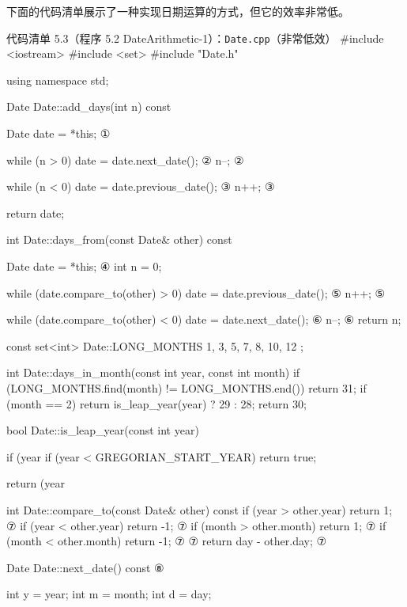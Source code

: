下面的代码清单展示了一种实现日期运算的方式，但它的效率非常低。

\begin{codeboxt}{代码清单 5.3（程序 5.2 DateArithmetic-1）：\texttt{Date.cpp}（非常低效）}
#include <iostream>
#include <set>
#include "Date.h"

using namespace std;

Date Date::add_days(int n) const
{
    Date date = *this;                            ①

    while (n > 0)
    {
        date = date.next_date();                  ②
        n--;                                      ②
    }

    while (n < 0)
    {
        date = date.previous_date();              ③
        n++;                                      ③
    }

    return date;
}

int Date::days_from(const Date& other) const
{
    Date date = *this;                            ④
    int n = 0;

    while (date.compare_to(other) > 0)
    {
        date = date.previous_date();              ⑤
        n++;                                      ⑤
    }

    while (date.compare_to(other) < 0)
    {
        date = date.next_date();                  ⑥ 
        n--;                                      ⑥
    }
    return n;
}

const set<int> Date::LONG_MONTHS { 1, 3, 5, 7, 8, 10, 12 };

int Date::days_in_month(const int year, const int month)
{
   if (LONG_MONTHS.find(month) != LONG_MONTHS.end()) return 31;
   if (month == 2) return is_leap_year(year) ? 29 : 28;
   return 30;
}

bool Date::is_leap_year(const int year)
{
   if (year%
   if (year < GREGORIAN_START_YEAR) return true;

   return (year%
}

int Date::compare_to(const Date& other) const
{
    if (year > other.year)   return 1;              ⑦
    if (year < other.year)   return -1;             ⑦
    if (month > other.month) return 1;              ⑦
    if (month < other.month) return -1;             ⑦
                                                    ⑦
    return day - other.day;                         ⑦
}

Date Date::next_date() const                        ⑧
{
    int y = year;
    int m = month;
    int d = day;

}
\end{codeboxt}
